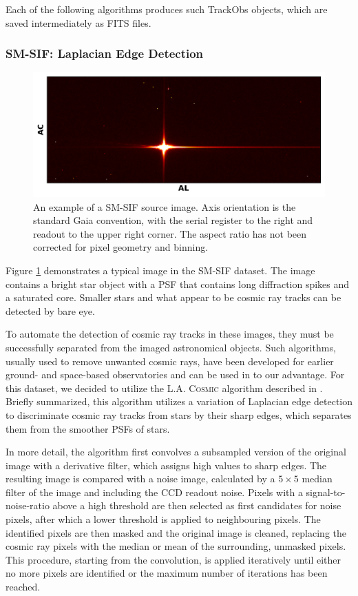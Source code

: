 \documentclass[a4paper, 11pt]{article}
\begin{document}
Each of the following algorithms produces such TrackObs objects, which are saved intermediately as FITS files.




\subsubsection{SM-SIF: Laplacian Edge Detection}
\begin{figure}
  \centering
  \includegraphics{images/SM_full_image}
  \caption{An example of a SM-SIF source image. Axis orientation is the standard Gaia convention, with the serial register to the right and readout to the upper right corner. The aspect ratio has not been corrected for pixel geometry and binning.}
  \label{fig:SM_full}
\end{figure}

Figure \ref{fig:SM_full} demonstrates a typical image in the SM-SIF dataset. The image contains a bright star object with a PSF that contains long diffraction spikes and a saturated core. Smaller stars and what appear to be cosmic ray tracks can be detected by bare eye.

To automate the detection of cosmic ray tracks in these images, they must be successfully separated from the imaged astronomical objects. Such algorithms, usually used to remove unwanted cosmic rays, have been developed for earlier ground- and space-based observatories and can be used in to our advantage. For this dataset, we decided to utilize the \textsc{L.A. Cosmic} algorithm described in \cite{Dokkum_cosmics}. Briefly summarized, this algorithm utilizes a variation of Laplacian edge detection to discriminate cosmic ray tracks from stars by their sharp edges, which separates them from the smoother PSFs of stars.

In more detail, the algorithm first convolves a subsampled version of the original image with a derivative filter, which assigns high values to sharp edges. The resulting image is compared with a noise image, calculated by a $5 \times 5$ median filter of the image and including the CCD readout noise. Pixels with a signal-to-noise-ratio above a high threshold are then selected as first candidates for noise pixels, after which a lower threshold is applied to neighbouring pixels. The identified pixels are then masked and the original image is cleaned, replacing the cosmic ray pixels with the median or mean of the surrounding, unmasked pixels. This procedure, starting from the convolution, is applied iteratively until either no more pixels are identified or the maximum number of iterations has been reached.
\end{document}

